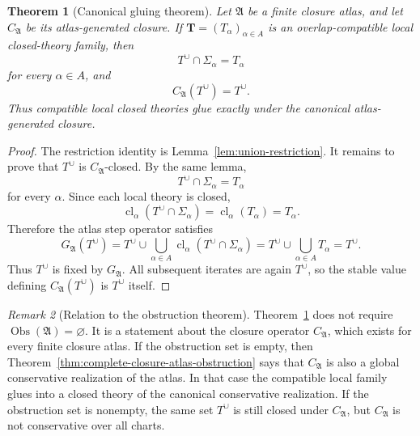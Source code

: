 \documentclass[11pt]{amsart}
\numberwithin{equation}{section}
\theoremstyle{plain}
\newtheorem{theorem}{Theorem}[section]
\theoremstyle{definition}
\theoremstyle{remark}
\newtheorem{remark}[theorem]{Remark}
\newcommand{\Cl}{\operatorname{cl}}
\newcommand{\A}{\mathfrak A}
\newcommand{\Sig}{\Sigma}
\newcommand{\Obs}{\operatorname{Obs}}
\newcommand{\CA}{C_{\mathfrak A}}
\newcommand{\GA}{G_{\mathfrak A}}
\newcommand{\Tcup}{T^{\cup}}
\begin{document}
\begin{theorem}[Canonical gluing theorem]
\label{thm:canonical-closed-theory-gluing}
Let \(\A\) be a finite closure atlas, and let \(\CA\) be its atlas-generated closure.  If \(\mathbf T=(T_\alpha)_{\alpha\in A}\) is an overlap-compatible local closed-theory family, then
\[
  \Tcup\cap\Sig_\alpha=T_\alpha
\]
for every \(\alpha\in A\), and
\[
  \CA(\Tcup)=\Tcup.
\]
Thus compatible local closed theories glue exactly under the canonical atlas-generated closure.
\end{theorem}

\begin{proof}
The restriction identity is Lemma~\ref{lem:union-restriction}.  It remains to prove that \(\Tcup\) is \(\CA\)-closed.  By the same lemma,
\[
  \Tcup\cap\Sig_\alpha=T_\alpha
\]
for every \(\alpha\).  Since each local theory is closed,
\[
  \Cl_\alpha(\Tcup\cap\Sig_\alpha)
  =
  \Cl_\alpha(T_\alpha)
  =
  T_\alpha.
\]
Therefore the atlas step operator satisfies
\[
  \GA(\Tcup)
  =
  \Tcup\cup\bigcup_{\alpha\in A}\Cl_\alpha(\Tcup\cap\Sig_\alpha)
  =
  \Tcup\cup\bigcup_{\alpha\in A}T_\alpha
  =
  \Tcup.
\]
Thus \(\Tcup\) is fixed by \(\GA\).  All subsequent iterates are again \(\Tcup\), so the stable value defining \(\CA(\Tcup)\) is \(\Tcup\) itself.
\end{proof}

\begin{remark}[Relation to the obstruction theorem]
Theorem~\ref{thm:canonical-closed-theory-gluing} does not require \(\Obs(\A)=\varnothing\).  It is a statement about the closure operator \(\CA\), which exists for every finite closure atlas.  If the obstruction set is empty, then Theorem~\ref{thm:complete-closure-atlas-obstruction} says that \(\CA\) is also a global conservative realization of the atlas.  In that case the compatible local family glues into a closed theory of the canonical conservative realization.  If the obstruction set is nonempty, the same set \(\Tcup\) is still closed under \(\CA\), but \(\CA\) is not conservative over all charts.
\end{remark}
\end{document}
